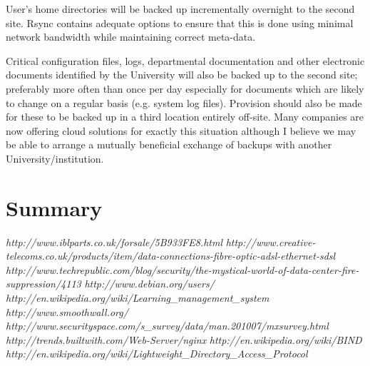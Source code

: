 \documentclass[a4paper, twoside]{article}
\begin{document}
User's home directories will be backed up incrementally overnight to the second
site. Rsync contains adequate options to ensure that this is done using minimal
network bandwidth while maintaining correct meta-data.

Critical configuration files, logs, departmental documentation and other
electronic documents identified by the University will also be backed up to the
second site; preferably more often than once per day especially for documents
which are likely to change on a regular basis (e.g. system log files). Provision
should also be made for these to be backed up in a third location entirely
off-site. Many companies are now offering cloud solutions for exactly this
situation although I believe we may be able to arrange a mutually beneficial
exchange of backups with another University/institution.

\section{Summary}

\begin{thebibliography}{1}

 {\em http://www.iblparts.co.uk/forsale/5B933FE8.html}
 {\em
  http://www.creative-telecoms.co.uk/products/item/data-connections-fibre-optic-adsl-ethernet-sdsl}
 {\em
  http://www.techrepublic.com/blog/security/the-mystical-world-of-data-center-fire-suppression/4113}
 {\em http://www.debian.org/users/}
 {\em http://en.wikipedia.org/wiki/Learning\_management\_system}
 {\em http://www.smoothwall.org/}
 {\em http://www.securityspace.com/s\_survey/data/man.201007/mxsurvey.html}
 {\em http://trends.builtwith.com/Web-Server/nginx}
 {\em http://en.wikipedia.org/wiki/BIND}
 {\em http://en.wikipedia.org/wiki/Lightweight\_Directory\_Access\_Protocol}

\end{thebibliography}
\end{document}
